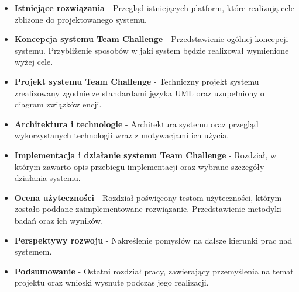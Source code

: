 \begin{itemize}

\item \textbf{Istniejące rozwiązania} - Przegląd istniejących platform, które realizują cele zbliżone do projektowanego systemu.  \\

\item \textbf{Koncepcja systemu Team Challenge} - Przedstawienie ogólnej koncepcji systemu. Przybliżenie sposobów w jaki system będzie realizował wymienione wyżej cele.   \\

\item \textbf{Projekt systemu Team Challenge} - Techniczny projekt systemu zrealizowany zgodnie ze standardami języka UML oraz uzupełniony o diagram związków encji. \\

\item \textbf{Architektura i technologie} - Architektura systemu oraz przegląd wykorzystanych technologii wraz z motywacjami ich użycia.  \\

\item \textbf{Implementacja i działanie systemu Team Challenge} - Rozdział, w którym zawarto opis przebiegu implementacji oraz wybrane szczegóły działania systemu.   \\

\item \textbf{Ocena użyteczności} - Rozdział poświęcony testom użyteczności, którym zostało poddane zaimplementowane rozwiązanie.  Przedstawienie metodyki badań oraz ich wyników. \\

\item \textbf{Perspektywy rozwoju} - Nakreślenie pomysłów na dalsze kierunki prac nad systemem.  \\

\item \textbf{Podsumowanie} - Ostatni rozdział pracy, zawierający przemyślenia na temat projektu oraz wnioski wysnute podczas jego realizacji.  \\

\end{itemize}



